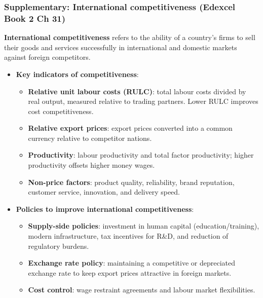 \documentclass[a4paper,12pt]{article}
\newcommand{\needbold}[1]{\textcolor{red!70!black}{\textbf{#1}}}
\begin{document}
\subsubsection*{Supplementary: International competitiveness (Edexcel Book 2 Ch 31)}
\needbold{International competitiveness} refers to the ability of a country's firms to sell their goods and services successfully in international and domestic markets against foreign competitors.
\begin{itemize}
  \item \textbf{Key indicators of competitiveness}:
  \begin{itemize}
    \item \textbf{Relative unit labour costs (RULC)}: total labour costs divided by real output, measured relative to trading partners. Lower RULC improves cost competitiveness.
    \item \textbf{Relative export prices}: export prices converted into a common currency relative to competitor nations.
    \item \textbf{Productivity}: labour productivity and total factor productivity; higher productivity offsets higher money wages.
    \item \textbf{Non-price factors}: product quality, reliability, brand reputation, customer service, innovation, and delivery speed.
  \end{itemize}
  \item \textbf{Policies to improve international competitiveness}:
  \begin{itemize}
    \item \textbf{Supply-side policies}: investment in human capital (education/training), modern infrastructure, tax incentives for R\&D, and reduction of regulatory burdens.
    \item \textbf{Exchange rate policy}: maintaining a competitive or depreciated exchange rate to keep export prices attractive in foreign markets.
    \item \textbf{Cost control}: wage restraint agreements and labour market flexibilities.
  \end{itemize}
\end{itemize}
\end{document}

